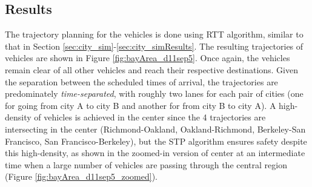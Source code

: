 \subsection{Results \label{sec:bayArea_simResults}}
The trajectory planning for the vehicles is done using RTT algorithm, similar to that in Section \ref{sec:city_sim}-\ref{sec:city_simResults}. The resulting trajectories of vehicles are shown in Figure \ref{fig:bayArea_d11sep5}. Once again, the vehicles remain clear of all other vehicles and reach their respective destinations. Given the separation between the scheduled times of arrival, the trajectories are predominately \textit{time-separated}, with roughly two lanes for each pair of cities (one for going from city A to city B and another for from city B to city A). A high-density of vehicles is achieved in the center since the 4 trajectories are intersecting in the center (Richmond-Oakland, Oakland-Richmond, Berkeley-San Francisco, San Francisco-Berkeley), but the STP algorithm ensures safety despite this high-density, as shown in the zoomed-in version of center at an intermediate time when a large number of vehicles are passing through the central region (Figure \ref{fig:bayArea_d11sep5_zoomed}).  
%
